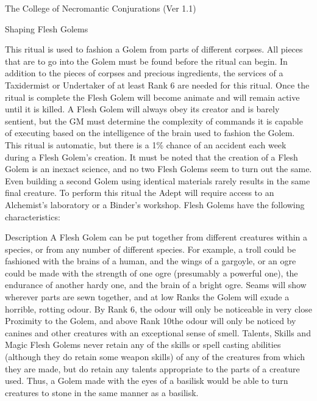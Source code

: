 \begin{Chapter}{The College of Necromantic Conjurations (Ver 1.1)}
\begin{ritual}[R-4]{Shaping Flesh Golems}
\begin{effects}
This ritual is used to fashion a Golem from parts of different
corpses. All pieces that are to go into the Golem must be found before
the ritual can begin.  In addition to the pieces of corpses and
precious ingredients, the services of a Taxidermist or Undertaker of
at least Rank 6 are needed for this ritual. Once the ritual is
complete the Flesh Golem will become animate and will remain active
until it is killed. A Flesh Golem will always obey its creator and is
barely sentient, but the GM must determine the complexity of commands
it is capable of executing based on the intelligence of the brain used
to fashion the Golem. This ritual is automatic, but there is a 1\%
chance of an accident each week during a Flesh Golem’s creation.  It
must be noted that the creation of a Flesh Golem is an inexact
science, and no two Flesh Golems seem to turn out the same.  Even
building a second Golem using identical materials rarely results in
the same final creature.  To perform this ritual the Adept will
require access to an Alchemist’s laboratory or a Binder’s
workshop. Flesh Golems have the following characteristics:

\begin{Description}
\item[Description] A Flesh Golem can be put together from different
  creatures within a species, or from any number of different
  species. For example, a troll could be fashioned with the brains of
  a human, and the wings of a gargoyle, or an ogre could be made with
  the strength of one ogre (presumably a powerful one), the endurance
  of another hardy one, and the brain of a bright ogre. Seams will
  show wherever parts are sewn together, and at low Ranks the Golem
  will exude a horrible, rotting odour. By Rank 6, the odour will only
  be noticeable in very close Proximity to the Golem, and above Rank
  10the odour will only be noticed by canines and other creatures with
  an exceptional sense of smell.  Talents, Skills and Magic Flesh
  Golems never retain any of the skills or spell casting abilities
  (although they do retain some weapon skills) of any of the creatures
  from which they are made, but do retain any talents appropriate to
  the parts of a creature used. Thus, a Golem made with the eyes of a
  basilisk would be able to turn creatures to stone in the same manner
  as a basilisk.


\end{Description}
\end{effects}
\end{ritual}
\end{Chapter}
